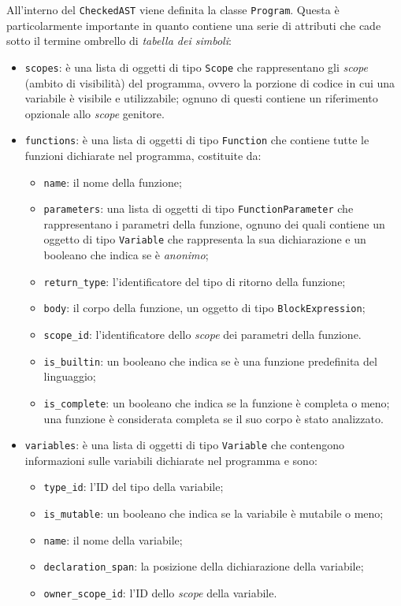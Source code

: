 All'interno del \texttt{CheckedAST} viene definita la classe \texttt{Program}. Questa \`e particolarmente importante in quanto contiene una serie di attributi che cade sotto il termine ombrello di \emph{tabella dei simboli}:
\begin{itemize}
	\item \texttt{scopes}: \`e una lista di oggetti di tipo \texttt{Scope} che rappresentano gli \emph{scope} (ambito di visibilit\`a) del programma, ovvero la porzione di codice in cui una variabile \`e visibile e utilizzabile; ognuno di questi contiene un riferimento opzionale allo \textit{scope} genitore.
	\item \texttt{functions}: \`e una lista di oggetti di tipo \texttt{Function} che contiene tutte le funzioni dichiarate nel programma, costituite da:
	\begin{itemize}
		\item \texttt{name}: il nome della funzione;
		\item \texttt{parameters}: una lista di oggetti di tipo \texttt{FunctionParameter} che rappresentano i parametri della funzione, ognuno dei quali contiene un oggetto di tipo \texttt{Variable} che rappresenta la sua dichiarazione e un booleano che indica se \`e \emph{anonimo};
		\item \texttt{return\_type}: l'identificatore del tipo di ritorno della funzione;
		\item \texttt{body}: il corpo della funzione, un oggetto di tipo \texttt{BlockExpression};
		\item \texttt{scope\_id}: l'identificatore dello \textit{scope} dei parametri della funzione.
		\item \texttt{is\_builtin}: un booleano che indica se \`e una funzione predefinita del linguaggio;
		\item \texttt{is\_complete}: un booleano che indica se la funzione \`e completa o meno; una funzione \`e considerata completa se il suo corpo \`e stato analizzato.
	\end{itemize}
	\item \texttt{variables}: è una lista di oggetti di tipo \texttt{Variable} che contengono informazioni sulle variabili dichiarate nel programma e sono:
	\begin{itemize}
		\item \texttt{type\_id}: l'ID del tipo della variabile;
		\item \texttt{is\_mutable}: un booleano che indica se la variabile \`e mutabile o meno;
		\item \texttt{name}: il nome della variabile;
		\item \texttt{declaration\_span}: la posizione della dichiarazione della variabile;
		\item \texttt{owner\_scope\_id}: l'ID dello \emph{scope} della variabile.
	\end{itemize}
\end{itemize}

